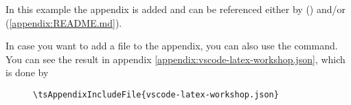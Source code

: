 In this example the appendix  is added and can be
referenced either by 
() and/or
 (\ref{appendix:README.md}).
\bigbreak

In case you want to add a file to the appendix, you can also use the
 command.
You can see the result in appendix \ref{appendix:vscode-latex-workshop.json},
which is done by

\begin{figure}[H]
    \small
    \centering
    \begin{BVerbatim}
\tsAppendixIncludeFile{vscode-latex-workshop.json}
    \end{BVerbatim}
\end{figure}
